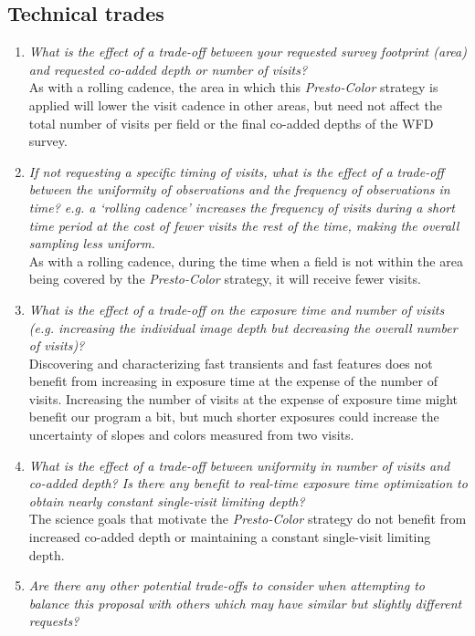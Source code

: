 \documentclass[12pt, letterpaper]{article}
\begin{document}
\subsection{Technical trades}
\begin{enumerate}
    \item {\footnotesize {\it What is the effect of a trade-off between your requested survey footprint (area) and requested co-added depth or number of visits?}} \\ As with a rolling cadence, the area in which this {\em Presto-Color} strategy is applied will lower the visit cadence in other areas, but need not affect the total number of visits per field or the final co-added depths of the WFD survey.
    \item {\footnotesize {\it If not requesting a specific timing of visits, what is the effect of a trade-off between the uniformity of observations and the frequency of observations in time? e.g. a `rolling cadence' increases the frequency of visits during a short time period at the cost of fewer visits the rest of the time, making the overall sampling less uniform.}} \\ As with a rolling cadence, during the time when a field is not within the area being covered by the {\em Presto-Color} strategy, it will receive fewer visits.
    \item {\footnotesize {\it What is the effect of a trade-off on the exposure time and number of visits (e.g. increasing the individual image depth but decreasing the overall number of visits)?}} \\ Discovering and characterizing fast transients and fast features does not benefit from increasing in exposure time at the expense of the number of visits. Increasing the number of visits at the expense of exposure time might benefit our program a bit, but much shorter exposures could increase the uncertainty of slopes and colors measured from two visits. 
    \item {\footnotesize {\it What is the effect of a trade-off between uniformity in number of visits and co-added depth? Is there any benefit to real-time exposure time optimization to obtain nearly constant single-visit limiting depth?}} \\ The science goals that motivate the {\em Presto-Color} strategy do not benefit from increased co-added depth or maintaining a constant single-visit limiting depth.
    \item {\footnotesize {\it Are there any other potential trade-offs to consider when attempting to balance this proposal with others which may have similar but slightly different requests?}}  
    

\end{enumerate}
\end{document}
